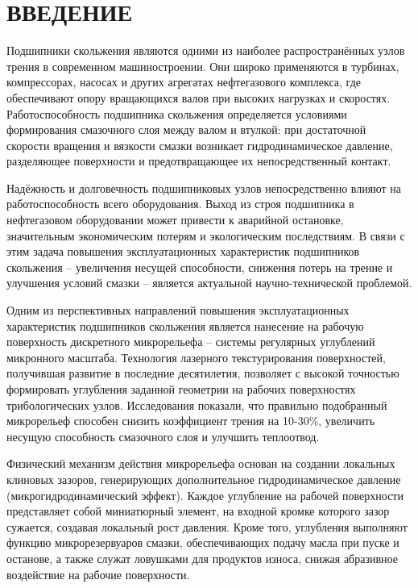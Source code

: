 \section*{ВВЕДЕНИЕ}

Подшипники скольжения являются одними из наиболее распространённых узлов трения в современном машиностроении. Они широко применяются в турбинах, компрессорах, насосах и других агрегатах нефтегазового комплекса, где обеспечивают опору вращающихся валов при высоких нагрузках и скоростях. Работоспособность подшипника скольжения определяется условиями формирования смазочного слоя между валом и втулкой: при достаточной скорости вращения и вязкости смазки возникает гидродинамическое давление, разделяющее поверхности и предотвращающее их непосредственный контакт.

Надёжность и долговечность подшипниковых узлов непосредственно влияют на работоспособность всего оборудования. Выход из строя подшипника в нефтегазовом оборудовании может привести к аварийной остановке, значительным экономическим потерям и экологическим последствиям. В связи с этим задача повышения эксплуатационных характеристик подшипников скольжения -- увеличения несущей способности, снижения потерь на трение и улучшения условий смазки -- является актуальной научно-технической проблемой.

Одним из перспективных направлений повышения эксплуатационных характеристик подшипников скольжения является нанесение на рабочую поверхность дискретного микрорельефа -- системы регулярных углублений микронного масштаба. Технология лазерного текстурирования поверхностей, получившая развитие в последние десятилетия, позволяет с высокой точностью формировать углубления заданной геометрии на рабочих поверхностях трибологических узлов. Исследования показали, что правильно подобранный микрорельеф способен снизить коэффициент трения на 10-30\%, увеличить несущую способность смазочного слоя и улучшить теплоотвод.

Физический механизм действия микрорельефа основан на создании локальных клиновых зазоров, генерирующих дополнительное гидродинамическое давление (микрогидродинамический эффект). Каждое углубление на рабочей поверхности представляет собой миниатюрный элемент, на входной кромке которого зазор сужается, создавая локальный рост давления. Кроме того, углубления выполняют функцию микрорезервуаров смазки, обеспечивающих подачу масла при пуске и останове, а также служат ловушками для продуктов износа, снижая абразивное воздействие на рабочие поверхности.

